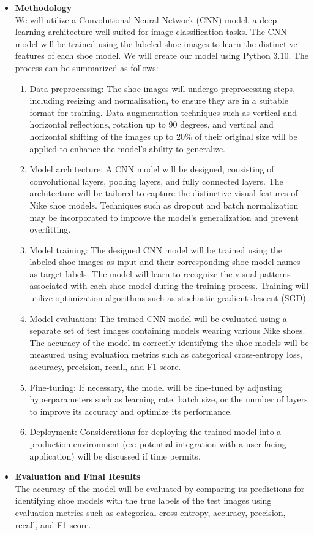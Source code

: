 \documentclass{article}
\begin{document}
\begin{itemize}
            \item[] \textbf{Methodology} \\
		We will utilize a Convolutional Neural Network (CNN) model, a deep learning architecture well-suited for image classification tasks. The CNN model will be trained using the labeled shoe images to learn the distinctive features of each shoe model. We will create our model using Python 3.10. The process can be summarized as follows: 
		\begin{enumerate}
			\item Data preprocessing: The shoe images will undergo preprocessing steps, including resizing and normalization, to ensure they are in a suitable format for training. Data augmentation techniques such as vertical and horizontal reflections, rotation up to 90 degrees, and vertical and horizontal shifting of the images up to 20\% of their original size will be applied to enhance the model's ability to generalize. 
			\item Model architecture: A CNN model will be designed, consisting of convolutional layers, pooling layers, and fully connected layers. The architecture will be tailored to capture the distinctive visual features of Nike shoe models. Techniques such as dropout and batch normalization may be incorporated to improve the model's generalization and prevent overfitting. 
			\item Model training: The designed CNN model will be trained using the labeled shoe images as input and their corresponding shoe model names as target labels. The model will learn to recognize the visual patterns associated with each shoe model during the training process. Training will utilize optimization algorithms such as stochastic gradient descent (SGD). 
			\item Model evaluation: The trained CNN model will be evaluated using a separate set of test images containing models wearing various Nike shoes. The accuracy of the model in correctly identifying the shoe models will be measured using evaluation metrics such as categorical cross-entropy loss, accuracy, precision, recall, and F1 score. 
			\item Fine-tuning: If necessary, the model will be fine-tuned by adjusting hyperparameters such as learning rate, batch size, or the number of layers to improve its accuracy and optimize its performance. 
			\item Deployment: Considerations for deploying the trained model into a production environment (ex: potential integration with a user-facing application) will be discussed if time permits. 
		\end{enumerate}
            \item[] \textbf{Evaluation and Final Results} \\
		The accuracy of the model will be evaluated by comparing its predictions for identifying shoe models with the true labels of the test images using evaluation metrics such as categorical cross-entropy, accuracy, precision, recall, and F1 score.  \\


\end{itemize}
\end{document}
